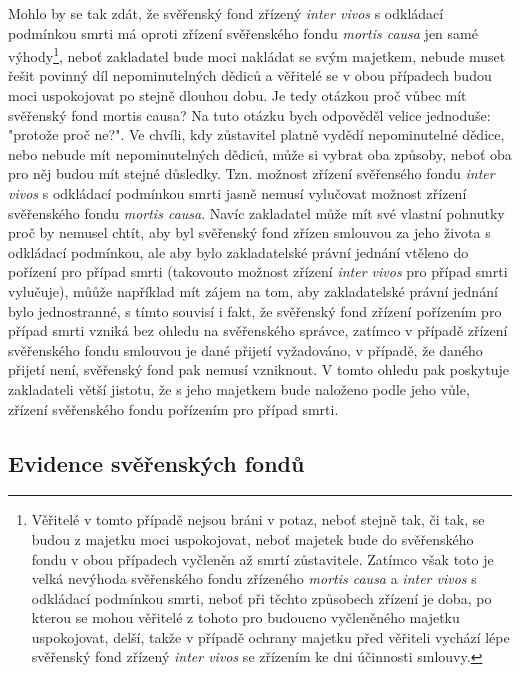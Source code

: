 \documentclass{article}
\begin{document}
Mohlo by se tak zdát, že svěřenský fond zřízený \textit{inter vivos} s odkládací podmínkou smrti má oproti zřízení svěřenského fondu \textit{mortis causa} jen samé výhody\footnote{Věřitelé v tomto případě nejsou bráni v potaz, neboť stejně tak, či tak, se budou z majetku moci uspokojovat, neboť majetek bude do svěřenského fondu v obou případech vyčleněn až smrtí zůstavitele. Zatímco však toto je velká nevýhoda svěřenského fondu zřízeného \textit{mortis causa} a \textit{inter vivos} s odkládací podmínkou smrti, neboť při těchto způsobech zřízení je doba, po kterou se mohou věřitelé z tohoto pro budoucno vyčleněného majetku uspokojovat, delší, takže v případě ochrany majetku před věřiteli vychází lépe svěřenský fond zřízený \textit{inter vivos} se zřízením ke dni účinnosti smlouvy.}, neboť zakladatel bude moci nakládat se svým majetkem, nebude muset řešit povinný díl nepominutelných dědiců a věřitelé se v obou případech budou moci uspokojovat po stejně dlouhou dobu. Je tedy otázkou proč vůbec mít svěřenský fond mortis causa? Na tuto otázku bych odpověděl velice jednoduše: "protože proč ne?". Ve chvíli, kdy zůstavitel platně vydědí nepominutelné dědice, nebo nebude mít nepominutelných dědiců, může si vybrat oba způsoby, neboť oba pro něj budou mít stejné důsledky. Tzn. možnost zřízení svěřensého fondu \textit{inter vivos} s odkládací podmínkou smrti jasně nemusí vylučovat možnost zřízení svěřenského fondu \textit{mortis causa}. Navíc zakladatel může mít své vlastní pohnutky proč by nemusel chtít, aby byl svěřenský fond zřízen smlouvou za jeho života s odkládací podmínkou, ale aby bylo zakladatelské právní jednání vtěleno do pořízení pro případ smrti (takovouto možnost zřízení \textit{inter vivos} pro případ smrti vylučuje), můůže například mít zájem na tom, aby zakladatelské právní jednání bylo jednostranné, s tímto souvisí i fakt, že svěřenský fond zřízení pořízením pro případ smrti vzniká bez ohledu na svěřenského správce, zatímco v případě zřízení svěřenského fondu smlouvou je dané přijetí vyžadováno, v případě, že daného přijetí není, svěřenský fond pak nemusí vzniknout. V tomto ohledu pak poskytuje zakladateli větší jistotu, že s jeho majetkem bude naloženo podle jeho vůle, zřízení svěřenského fondu pořízením pro případ smrti.\\

\subsection{Evidence svěřenských fondů}
\end{document}
